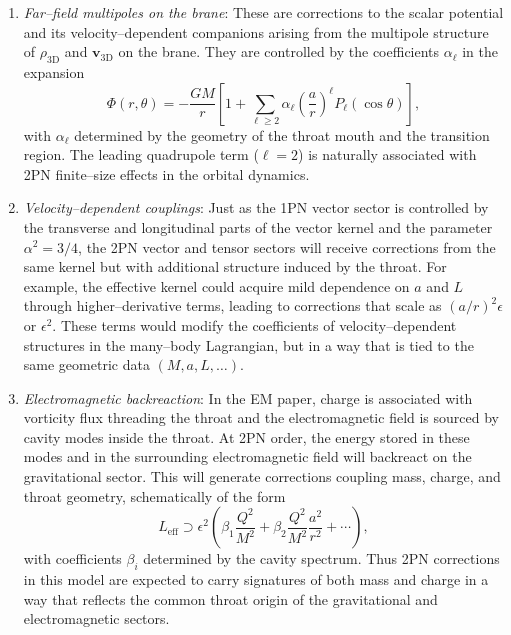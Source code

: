 \documentclass[12pt]{article}
\begin{document}
\begin{enumerate}
  \item \emph{Far--field multipoles on the brane}: These are corrections to
  the scalar potential and its velocity--dependent companions arising from
  the multipole structure of $\rho_{\mathrm{3D}}$ and
  $\mathbf{v}_{\mathrm{3D}}$ on the brane.  They are controlled by the
  coefficients $\alpha_\ell$ in the expansion
  \begin{equation}
    \Phi(r,\theta)
    = -\frac{GM}{r}
      \left[
        1
        + \sum_{\ell\ge 2}
            \alpha_\ell
            \left(\frac{a}{r}\right)^\ell
            P_\ell(\cos\theta)
      \right],
  \end{equation}
  with $\alpha_\ell$ determined by the geometry of the throat mouth and the
  transition region.  The leading quadrupole term ($\ell=2$) is naturally
  associated with 2PN finite--size effects in the orbital dynamics.

  \item \emph{Velocity--dependent couplings}: Just as the 1PN vector sector
  is controlled by the transverse and longitudinal parts of the vector
  kernel and the parameter $\alpha^2=3/4$, the 2PN vector and tensor
  sectors will receive corrections from the same kernel but with additional
  structure induced by the throat.  For example, the effective kernel could
  acquire mild dependence on $a$ and $L$ through higher--derivative terms,
  leading to corrections that scale as $(a/r)^2\epsilon$ or $\epsilon^2$.
  These terms would modify the coefficients of velocity--dependent
  structures in the many--body Lagrangian, but in a way that is tied to the
  same geometric data $(M,a,L,\ldots)$.

  \item \emph{Electromagnetic backreaction}: In the EM paper, charge is
  associated with vorticity flux threading the throat and the electromagnetic
  field is sourced by cavity modes inside the throat.  At 2PN order, the
  energy stored in these modes and in the surrounding electromagnetic field
  will backreact on the gravitational sector.  This will generate
  corrections coupling mass, charge, and throat geometry, schematically of
  the form
  \begin{equation}
    L_{\mathrm{eff}}
    \supset \epsilon^2
      \left(
        \beta_1 \frac{Q^2}{M^2}
        + \beta_2 \frac{Q^2}{M^2}\frac{a^2}{r^2}
        + \cdots
      \right),
  \end{equation}
  with coefficients $\beta_i$ determined by the cavity spectrum.  Thus 2PN
  corrections in this model are expected to carry signatures of both mass
  and charge in a way that reflects the common throat origin of the
  gravitational and electromagnetic sectors.
\end{enumerate}
\end{document}
